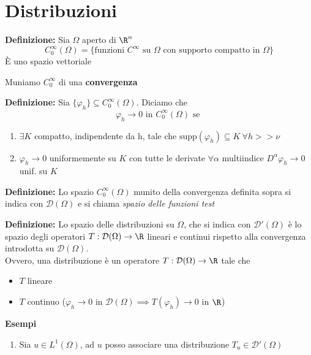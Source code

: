 

\section{Distribuzioni}
\begin{tcolorbox}
\textbf{Definizione: }Sia $\Omega$ aperto di $\R^n$ 
\[C_0^\infty(\Omega)=\{\text{funzioni }C^\infty\text{ su }\Omega\text{ con supporto compatto in }\Omega\}\]
È uno spazio vettoriale
\end{tcolorbox}
Muniamo $C_0^\infty$ di una \textbf{convergenza} 
\begin{tcolorbox}
	\textbf{Definizione: }Sia $\{\varphi_h\} \subseteq  C_0^\infty(\Omega)$. Diciamo che 
	\[\varphi_h\to 0\text{ in }C_0^\infty(\Omega)\text{ se }\]
\begin{enumerate}
	\item $\exists K$ compatto, indipendente da h, tale che $\text{supp}(\varphi_h)\subseteq  K\ \forall h> >\nu$
	\item $\varphi_h\to 0$ uniformemente su $K$ con tutte le derivate $\forall \alpha$ multiindice $D^\alpha\varphi_h\to 0$ unif. su $K$
\end{enumerate}
\end{tcolorbox}
\begin{tcolorbox}
	\textbf{Definizione: }Lo spazio $C_0^\infty(\Omega)$ munito della convergenza definita sopra si indica con $\mathcal D(\Omega)$ e si chiama \emph{spazio delle funzioni test}
\end{tcolorbox}
\begin{tcolorbox}
	\textbf{Definizione: }Lo spazio delle distribuzioni su $\Omega $, che si indica con $\mathcal D'(\Omega)$ è lo spazio degli operatori $T:\mathcal D(\Omega)\to \R$ lineari e continui rispetto alla convergenza introdotta su $\mathcal D(\Omega)$.\\Ovvero, una distribuzione è un operatore $T:\mathcal D(\Omega)\to \R$ tale che 
	\begin{itemize}
		\item $T$ lineare
		\item $T$ continuo ($\varphi_h\to 0$ in $\mathcal D(\Omega)\implies T(\varphi_h)\to 0$ in $\R$)
	\end{itemize}
\end{tcolorbox}
\textbf{Esempi} 
\begin{enumerate}
	\item Sia $u\in L^{1}(\Omega)$, ad $u$ posso associare una distribuzione $T_u\in \mathcal D'(\Omega)$
\end{enumerate}
